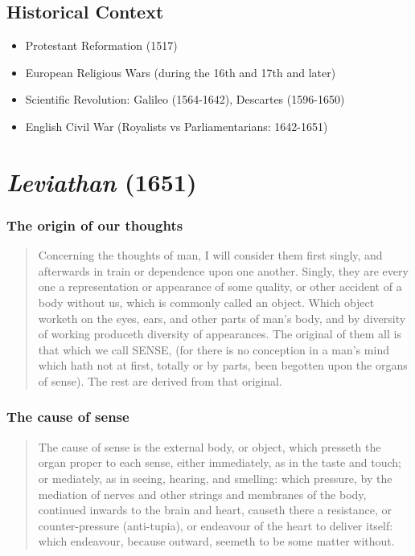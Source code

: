 
    \subsection*{Historical Context}

        \begin{itemize}
            \item Protestant Reformation (1517)
            \item European Religious Wars (during the 16th and 17th and later)
            \item Scientific Revolution: Galileo (1564-1642), Descartes (1596-1650)
            \item English Civil War (Royalists vs Parliamentarians: 1642-1651)
        \end{itemize}

\section{\textit{Leviathan} (1651)}

        \subsubsection{The origin of our thoughts}

            \begin{quote}
                Concerning the thoughts of man, I will consider them first singly, and afterwards in train or dependence upon one another. Singly, they are every one a representation or appearance of some quality, or other accident of a body without us, which is commonly called an object. Which object worketh on the eyes, ears, and other parts of man’s body, and by diversity of working produceth diversity of appearances.  The original of them all is that which we call SENSE, (for there is no conception in a man’s mind which hath not at first, totally or by parts, been begotten upon the organs of sense). The rest are derived from that original. 
            \end{quote} 

        \subsubsection{The cause of sense}

            \begin{quote}
                The cause of sense is the external body, or object, which presseth the organ proper to each sense, either immediately, as in the taste and touch; or mediately, as in seeing, hearing, and smelling: which pressure, by the mediation of nerves and other strings and membranes of the body, continued inwards to the brain and heart, causeth there a resistance, or counter-pressure (anti-tupia), or endeavour of the heart to deliver itself: which endeavour, because outward, seemeth to be some matter without.
            \end{quote}

